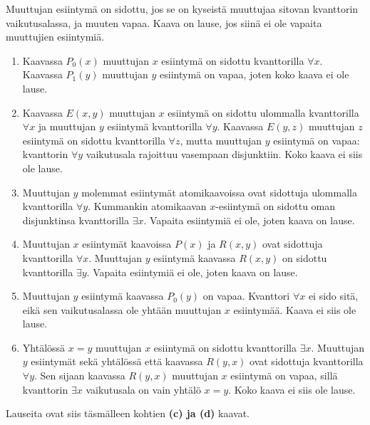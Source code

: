 \documentclass[11pt,a4paper]{amsart}
\begin{document}
\begin{solution}
  Muuttujan esiintymä on sidottu, jos se on kyseistä muuttujaa sitovan
  kvanttorin vaikutusalassa, ja muuten vapaa. Kaava on lause, jos siinä
  ei ole vapaita muuttujien esiintymiä.
  \begin{enumerate}[label=(\alph*)]
    \item Kaavassa \(P_0(x)\) muuttujan \(x\) esiintymä on sidottu
      kvanttorilla \(\forall x\). Kaavassa \(P_1(y)\) muuttujan \(y\)
      esiintymä on vapaa, joten koko kaava ei ole lause.

    \item Kaavassa \(E(x,y)\) muuttujan \(x\) esiintymä on sidottu
      ulommalla kvanttorilla \(\forall x\) ja muuttujan \(y\) esiintymä
      kvanttorilla \(\forall y\). Kaavassa \(E(y,z)\) muuttujan \(z\)
      esiintymä on sidottu kvanttorilla \(\forall z\), mutta muuttujan
      \(y\) esiintymä on vapaa: kvanttorin \(\forall y\) vaikutusala
      rajoittuu vasempaan disjunktiin. Koko kaava ei siis ole lause.

    \item Muuttujan \(y\) molemmat esiintymät atomikaavoissa ovat sidottuja
      ulommalla kvanttorilla \(\forall y\). Kummankin atomikaavan
      \(x\)-esiintymä on sidottu oman disjunktinsa kvanttorilla
      \(\exists x\). Vapaita esiintymiä ei ole, joten kaava on lause.

    \item Muuttujan \(x\) esiintymät kaavoissa \(P(x)\) ja \(R(x,y)\)
      ovat sidottuja kvanttorilla \(\forall x\). Muuttujan \(y\) esiintymä
      kaavassa \(R(x,y)\) on sidottu kvanttorilla \(\exists y\).
      Vapaita esiintymiä ei ole, joten kaava on lause.

    \item Muuttujan \(y\) esiintymä kaavassa \(P_0(y)\) on vapaa.
      Kvanttori \(\forall x\) ei sido sitä, eikä sen vaikutusalassa ole
      yhtään muuttujan \(x\) esiintymää. Kaava ei siis ole lause.

    \item Yhtälössä \(x = y\) muuttujan \(x\) esiintymä on sidottu
      kvanttorilla \(\exists x\). Muuttujan \(y\) esiintymät sekä yhtälössä
      että kaavassa \(R(y,x)\) ovat sidottuja kvanttorilla \(\forall y\).
      Sen sijaan kaavassa \(R(y,x)\) muuttujan \(x\) esiintymä on vapaa,
      sillä kvanttorin \(\exists x\) vaikutusala on vain yhtälö \(x = y\).
      Koko kaava ei siis ole lause.
  \end{enumerate}
  Lauseita ovat siis täsmälleen kohtien \textbf{(c) ja (d)} kaavat.\qedhere
\end{solution}
\end{document}

